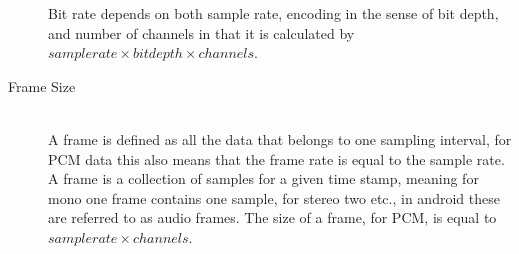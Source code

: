 \begin{description}
    Bit rate depends on both sample rate, encoding in the sense of bit depth, and number of channels in that it is calculated by $sample rate \times bit depth \times channels$.
    \item [Frame Size]\cite{audioformat} \hfill \\
    A frame is defined as all the data that belongs to one sampling interval, for PCM data this also means that the frame rate is equal to the sample rate.
    A frame is a collection of samples for a given time stamp, meaning for mono one frame contains one sample, for stereo two etc., in android these are referred to as audio frames.
    The size of a frame, for PCM, is equal to $sample rate \times channels$.
\end{description}

